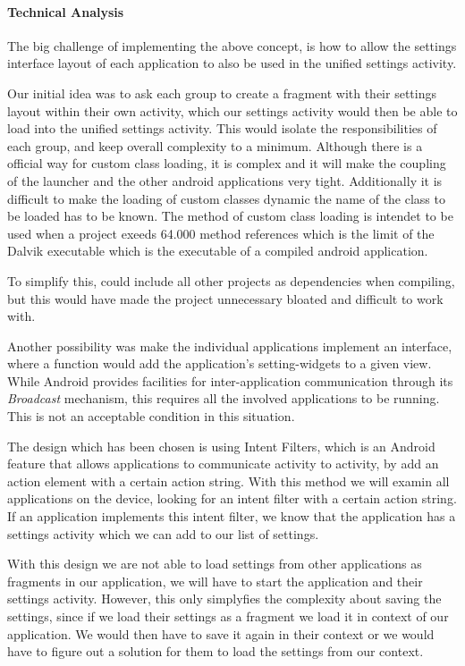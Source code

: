 \paragraph{Technical Analysis}
The big challenge of implementing the above concept, is how to allow the settings interface layout of each application to also be used in the unified settings activity. 

Our initial idea was to ask each group to create a fragment with their settings layout within their own activity, which our settings activity would then be able to load into the unified settings activity. This would isolate the responsibilities of each group, and keep overall complexity to a minimum. Although there is a official way for custom class loading\citet{customClassLoading}, it is complex and it will make the coupling of the launcher and the other android applications very tight. Additionally it is difficult to make the loading of custom classes dynamic the name of the class to be loaded has to be known. The method of custom class loading is intendet to be used when a project exeeds 64.000 method references which is the limit of the Dalvik executable which is the executable of a compiled android application.

To simplify this, \launcher could include all other projects as dependencies when compiling, but this would have made the \launcher project unnecessary bloated and difficult to work with.

Another possibility was make the individual applications implement an interface, where a function would add the application's setting-widgets to a given view. While Android provides facilities for inter-application communication through its \textit{Broadcast} mechanism\cite{broadcastReceiver}, this requires all the involved applications to be running. This is not an acceptable condition in this situation. 

The design which has been chosen is using Intent Filters\cite{intentFilter}, which is an Android feature that allows applications to communicate activity to activity, by add an action element with a certain action string.
With this method we will examin all applications on the device, looking for an intent filter with a certain action string.
If an application implements this intent filter, we know that the application has a settings activity which we can add to our list of settings.

With this design we are not able to load settings from other applications as fragments in our application, we will have to start the application and their settings activity. However, this only simplyfies the complexity about saving the settings, since if we load their settings as a fragment we load it in context of our application. We would then have to save it again in their context or we would have to figure out a solution for them to load the settings from our context.


